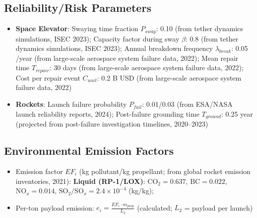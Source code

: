\documentclass{mcmthesis}
\begin{document}
\subsection{Reliability/Risk Parameters}
\begin{itemize}
\item \textbf{Space Elevator}: 
  Swaying time fraction $P_{sway}$: 0.10 (from tether dynamics simulations, ISEC 2023);
  Capacity factor during sway $\beta$: 0.8 (from tether dynamics simulations, ISEC 2023);
  Annual breakdown frequency $\lambda_{break}$: 0.05 /year (from large-scale aerospace system failure data, 2022);
  Mean repair time $T_{repair}$: 30 days (from large-scale aerospace system failure data, 2022);
  Cost per repair event $C_{unit}$: 0.2 B USD (from large-scale aerospace system failure data, 2022)
\item \textbf{Rockets}: 
  Launch failure probability $P_{fail}$: 0.01/0.03 (from ESA/NASA launch reliability reports, 2024);
  Post-failure grounding time $T_{ground}$: 0.25 year (projected from post-failure investigation timelines, 2020--2023)
\end{itemize}


\subsection{Environmental Emission Factors}
\begin{itemize}
\item Emission factor $EF_i$ (kg pollutant/kg propellant; from global rocket emission inventories, 2021):
  \textbf{Liquid (RP-1/LOX)}: $\text{CO}_2=0.637$, $\text{BC}=0.022$, $\text{NO}_x=0.014$, $\text{SO}_2/\text{SO}_x=2.4\times 10^{-4}$ (kg/kg);
\item Per-ton payload emission: $e_i = \frac{EF_i \cdot m_{\text{prop}}}{L_2}$ (calculated; $L_2$ = payload per launch)
\end{itemize}
\end{document}
